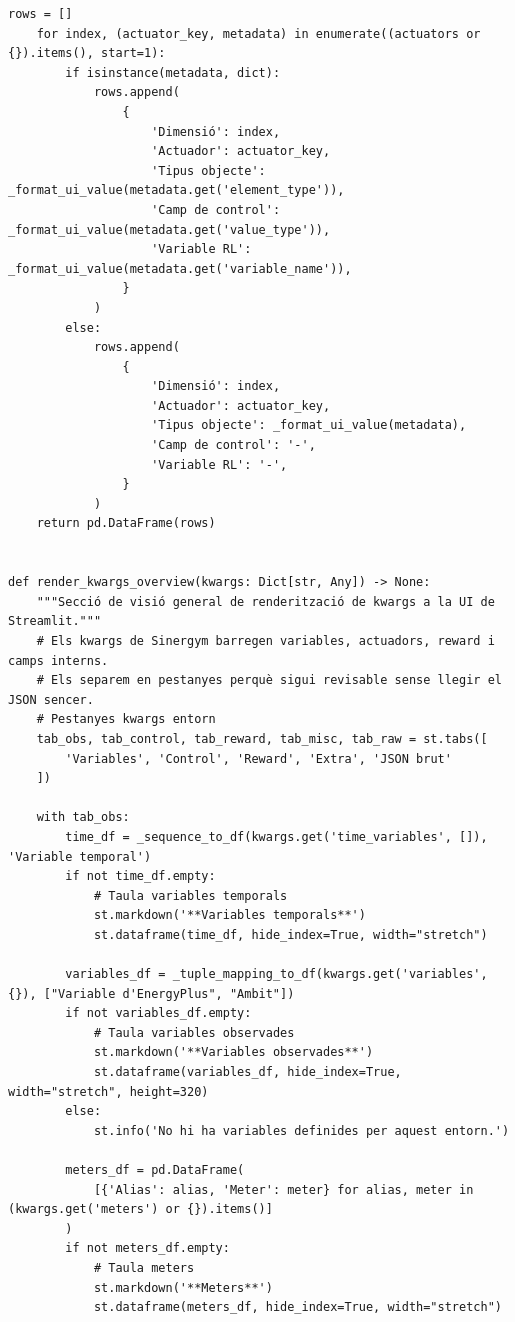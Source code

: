 \documentclass[10pt,a4paper]{article}
\begin{document}
\begin{lstlisting}[style=studioPython,caption={pages/Mostrar\_Entorn.py},label={lst:pages-mostrar-entorn-py}]
    rows = []
    for index, (actuator_key, metadata) in enumerate((actuators or {}).items(), start=1):
        if isinstance(metadata, dict):
            rows.append(
                {
                    'Dimensió': index,
                    'Actuador': actuator_key,
                    'Tipus objecte': _format_ui_value(metadata.get('element_type')),
                    'Camp de control': _format_ui_value(metadata.get('value_type')),
                    'Variable RL': _format_ui_value(metadata.get('variable_name')),
                }
            )
        else:
            rows.append(
                {
                    'Dimensió': index,
                    'Actuador': actuator_key,
                    'Tipus objecte': _format_ui_value(metadata),
                    'Camp de control': '-',
                    'Variable RL': '-',
                }
            )
    return pd.DataFrame(rows)


def render_kwargs_overview(kwargs: Dict[str, Any]) -> None:
    """Secció de visió general de renderització de kwargs a la UI de Streamlit."""
    # Els kwargs de Sinergym barregen variables, actuadors, reward i camps interns.
    # Els separem en pestanyes perquè sigui revisable sense llegir el JSON sencer.
    # Pestanyes kwargs entorn
    tab_obs, tab_control, tab_reward, tab_misc, tab_raw = st.tabs([
        'Variables', 'Control', 'Reward', 'Extra', 'JSON brut'
    ])

    with tab_obs:
        time_df = _sequence_to_df(kwargs.get('time_variables', []), 'Variable temporal')
        if not time_df.empty:
            # Taula variables temporals
            st.markdown('**Variables temporals**')
            st.dataframe(time_df, hide_index=True, width="stretch")

        variables_df = _tuple_mapping_to_df(kwargs.get('variables', {}), ["Variable d'EnergyPlus", "Ambit"])
        if not variables_df.empty:
            # Taula variables observades
            st.markdown('**Variables observades**')
            st.dataframe(variables_df, hide_index=True, width="stretch", height=320)
        else:
            st.info('No hi ha variables definides per aquest entorn.')

        meters_df = pd.DataFrame(
            [{'Alias': alias, 'Meter': meter} for alias, meter in (kwargs.get('meters') or {}).items()]
        )
        if not meters_df.empty:
            # Taula meters
            st.markdown('**Meters**')
            st.dataframe(meters_df, hide_index=True, width="stretch")


\end{lstlisting}
\end{document}
